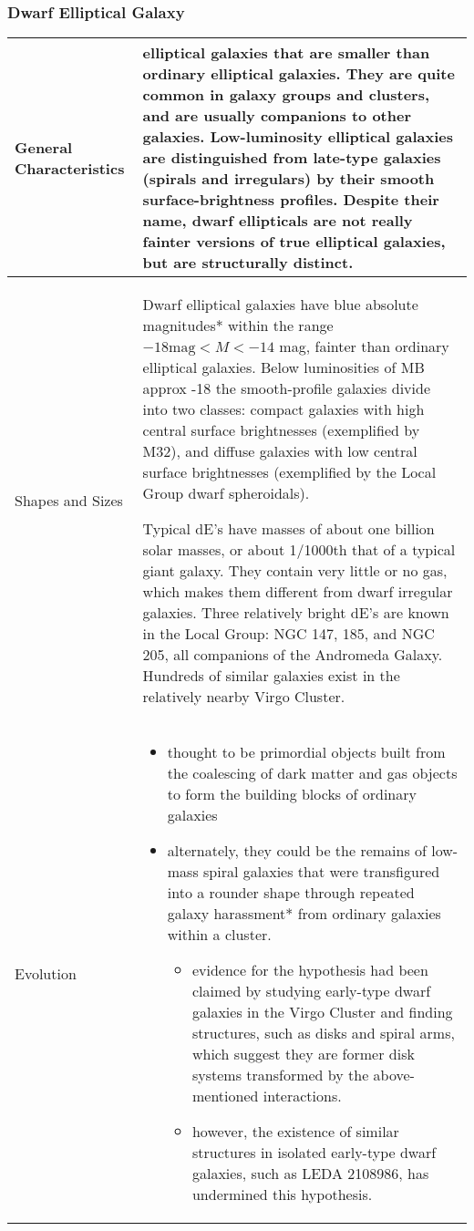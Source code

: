 \subsubsection{Dwarf Elliptical Galaxy}
\begin{longtabu} to 
\hline
General Characteristics &
 elliptical galaxies that are smaller than ordinary elliptical galaxies. They are quite common in galaxy groups and clusters, and are usually companions to other galaxies. Low-luminosity elliptical galaxies are distinguished from late-type galaxies (spirals and irregulars) by their smooth surface-brightness profiles.
Despite their name, dwarf ellipticals are not really fainter versions of true elliptical galaxies, but are structurally distinct.
 \\
 \hline
 Shapes and Sizes &
 Dwarf elliptical galaxies have blue \gls{absolute magnitude}s* within the range $-18 \textrm{mag} < M < -14$ mag, fainter than ordinary elliptical galaxies. Below luminosities of MB approx -18 the smooth-profile galaxies divide into two classes: compact galaxies with high central surface brightnesses (exemplified by M32), and diffuse galaxies with low central surface brightnesses (exemplified by the Local Group dwarf spheroidals).
 
 Typical dE's have masses of about one billion solar masses, or about 1/1000th that of a typical giant galaxy. They contain very little or no gas, which makes them different from dwarf irregular galaxies. Three relatively bright dE's are known in the Local Group: NGC 147, 185, and NGC 205, all companions of the Andromeda Galaxy. Hundreds of similar galaxies exist in the relatively nearby Virgo Cluster.
 \\
 \hline
 Evolution &
 \begin{itemize}[noitemsep]
 	\item thought to be primordial objects built from the coalescing of dark matter and gas objects to form the building blocks of ordinary galaxies
	\item alternately, they could be the remains of low-mass spiral galaxies that were transfigured into a rounder shape through repeated \gls{galaxy harassment}* from ordinary galaxies within a cluster. 
		\begin{itemize}[noitemsep]
			\item evidence for the hypothesis had been claimed by studying early-type dwarf galaxies in the Virgo Cluster and finding structures, such as disks and spiral arms, which suggest they are former disk systems transformed by the above-mentioned interactions. 
			\item however, the existence of similar structures in isolated early-type dwarf galaxies, such as LEDA 2108986, has undermined this hypothesis.
		\end{itemize}
\end{itemize}
\\
\hline
\end{longtabu}